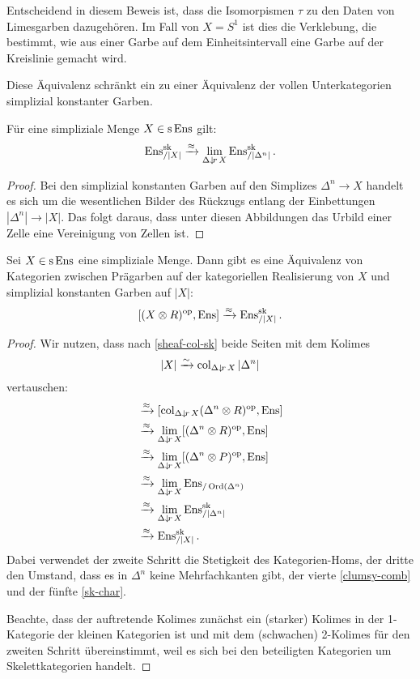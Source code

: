 \begin{bem}
  Entscheidend in diesem Beweis ist, dass die Isomorpismen $\tau$ zu
  den Daten von Limesgarben dazugehören. Im Fall von $X = S^1$ ist
  dies die Verklebung, die bestimmt, wie aus einer Garbe auf dem
  Einheitsintervall eine Garbe auf der Kreislinie gemacht wird.
\end{bem}
Diese Äquivalenz schränkt ein zu einer Äquivalenz der vollen
Unterkategorien simplizial konstanter Garben.
\begin{prop} \label{sheaf-col-sk}
 Für eine simpliziale Menge $X \in \operatorname{s}\operatorname{Ens}$ gilt:
  \[ \operatorname{Ens}_{/|X|}^{\operatorname{sk}} \xrightarrow{\approx} \lim_{\Delta \downarrow \! {\scriptstyle r} \, X} \operatorname{Ens}_{/|\Delta^n|}^{\operatorname{sk}}. \]
\end{prop}
\begin{proof}
  Bei den simplizial konstanten Garben auf den Simplizes $\Delta^n \to
  X$ handelt es sich um die wesentlichen Bilder des Rückzugs entlang
  der Einbettungen $|\Delta^n| \to |X|$. Das folgt daraus, dass unter
  diesen Abbildungen das Urbild einer Zelle eine Vereinigung von
  Zellen ist.
\end{proof}
\begin{theorem} \label{sheaf-sset-sk}
  Sei $X \in \operatorname{s}\operatorname{Ens}$ eine simpliziale Menge. Dann gibt es eine
  Äquivalenz von Kategorien zwischen Prägarben auf der kategoriellen
  Realisierung von $X$ und simplizial konstanten Garben auf $|X|$:
  \[ [(X \otimes R)^\mathrm{op}, \operatorname{Ens}] \xrightarrow{\approx} \operatorname{Ens}^{\operatorname{sk}}_{/|X|} .\]
\end{theorem}
\begin{proof}
  Wir nutzen, dass nach \ref{sheaf-col-sk} beide Seiten mit dem
  Kolimes
  \[ |X| \xrightarrow[]{\sim} \operatorname{col}_{\Delta \downarrow \! {\scriptstyle r} \, X} |\Delta^n| \]
  vertauschen:
  \begin{align*}
    [(X \otimes R)\op, \Ens]
    &\qiso [\col_{\slicecat{\Delta}{r}{X}} (\Delta^n \otimes R)\op, \Ens] \\
    &\qiso \lim_{\slicecat{\Delta}{r}{X}} [(\Delta^n \otimes R)\op, \Ens] \\
    &\qiso \lim_{\slicecat{\Delta}{r}{X}} [(\Delta^n \otimes P)\op, \Ens] \\
    &\qiso \lim_{\slicecat{\Delta}{r}{X}} \Ens_{/\Ord(\Delta^n)} \\
    &\qiso \lim_{\slicecat{\Delta}{r}{X}} \Ens_{/|\Delta^n|}^{\sk} \\
    &\qiso \Ens_{/|X|}^{\sk}.    
  \end{align*}
  Dabei verwendet der zweite Schritt die Stetigkeit des
  Kategorien-Homs, der dritte den Umstand, dass es in $\Delta^n$ keine
  Mehrfachkanten gibt, der vierte \ref{clumsy-comb} und der fünfte
  \ref{sk-char}.

  Beachte, dass der auftretende Kolimes zunächst ein (starker) Kolimes
  in der 1-Kategorie der kleinen Kategorien ist und mit dem
  (schwachen) 2-Kolimes für den zweiten Schritt übereinstimmt, weil es
  sich bei den beteiligten Kategorien um Skelettkategorien handelt.
\end{proof}

